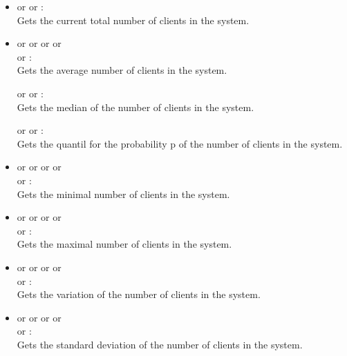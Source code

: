\begin{itemize}

\item
{} or  or :\\
Gets the current total number of clients in the system.

\item
{} or  or  or  or\\
 or :\\
Gets the average number of clients in the system.

 or  or :\\
Gets the median of the number of clients in the system.

 or  or :\\
Gets the quantil for the probability p of the number of clients in the system.

\item
{} or  or  or  or\\
 or :\\
Gets the minimal number of clients in the system.

\item
{} or  or  or  or\\
 or :\\
Gets the maximal number of clients in the system.

\item
{} or  or  or  or\\
 or :\\
Gets the variation of the number of clients in the system.

\item
{} or  or  or  or\\
 or :\\
Gets the standard deviation of the number of clients in the system.


\end{itemize}

